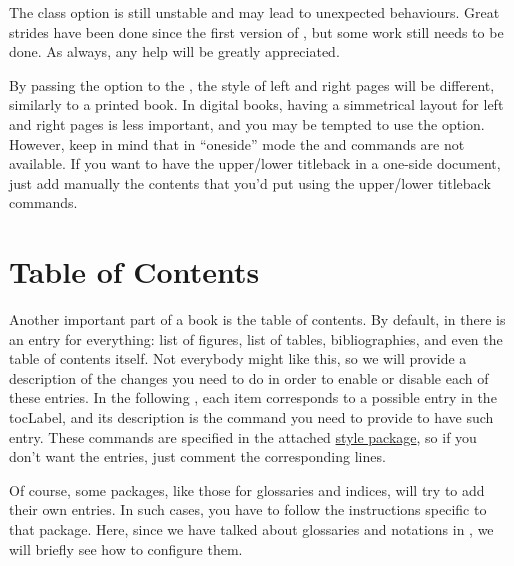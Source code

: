 \begin{kaobox}[frametitle=To Do]
The  class option is still unstable and may lead to 
unexpected behaviours. Great strides have been done since the first 
version of , but some work still needs to be done. As 
always, any help will be greatly appreciated.
\end{kaobox}

By passing the  option to the , the
style of left and right pages will be different, similarly to a
printed book. In digital books, having a simmetrical layout for
left and right pages is less important, and you may be tempted
to use the  option. However, keep in mind
that in \enquote{oneside} mode the  and
 commands are not available. If you want to have 
the upper/lower titleback in a one-side document, just add manually the 
contents that you'd put using the upper/lower titleback commands.

\section{Table of Contents}

Another important part of a book is the table of contents. By default, 
in  there is an entry for everything: list of figures, 
list of tables, bibliographies, and even the table of contents itself. 
Not everybody might like this, so we will provide a description of the 
changes you need to do in order to enable or disable each of these 
entries. In the following , each item corresponds to 
a possible entry in the \acrshort{tocLabel}, and its description is the 
command you need to provide to have such entry. These commands are 
specified in the attached \href{style/style.sty}{style 
package}, so if you don't want the entries, just comment the 
corresponding lines.

Of course, some packages, like those for glossaries and indices, will 
try to add their own entries. In such cases, you have to follow the 
instructions specific to that package. Here, since we have talked about 
glossaries and notations in , we will briefly see how
to configure them.

